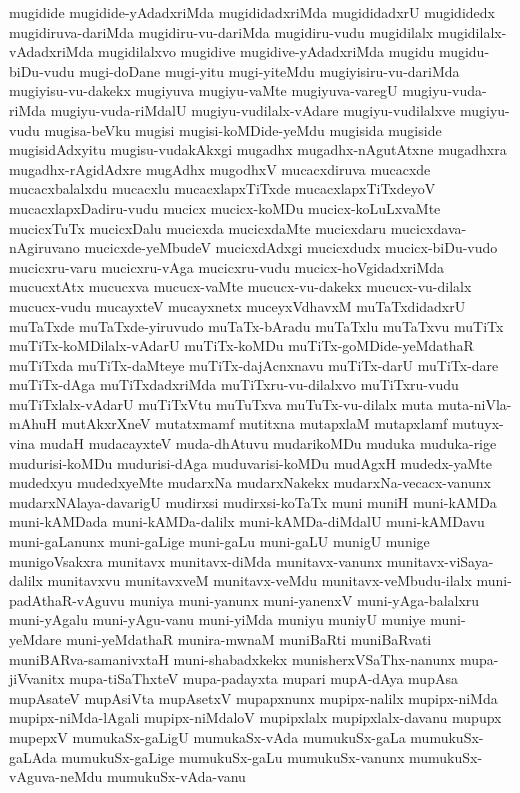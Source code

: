 {mugidide
mugidide-yAdadxriMda
mugididadxriMda
mugididadxrU
mugididedx
mugidiruva-dariMda
mugidiru-vu-dariMda
mugidiru-vudu
mugidilalx
mugidilalx-vAdadxriMda
mugidilalxvo
mugidive
mugidive-yAdadxriMda
mugidu
mugidu-biDu-vudu
mugi-doDane
mugi-yitu
mugi-yiteMdu
mugiyisiru-vu-dariMda
mugiyisu-vu-dakekx
mugiyuva
mugiyu-vaMte
mugiyuva-varegU
mugiyu-vuda-riMda
mugiyu-vuda-riMdalU
mugiyu-vudilalx-vAdare
mugiyu-vudilalxve
mugiyu-vudu
mugisa-beVku
mugisi
mugisi-koMDide-yeMdu
mugisida
mugiside
mugisidAdxyitu
mugisu-vudakAkxgi
mugadhx
mugadhx-nAgutAtxne
mugadhxra
mugadhx-rAgidAdxre
mugAdhx
mugodhxV
mucacxdiruva
mucacxde
mucacxbalalxdu
mucacxlu
mucacxlapxTiTxde
mucacxlapxTiTxdeyoV
mucacxlapxDadiru-vudu
mucicx
mucicx-koMDu
mucicx-koLuLxvaMte
mucicxTuTx
mucicxDalu
mucicxda
mucicxdaMte
mucicxdaru
mucicxdava-nAgiruvano
mucicxde-yeMbudeV
mucicxdAdxgi
mucicxdudx
mucicx-biDu-vudo
mucicxru-varu
mucicxru-vAga
mucicxru-vudu
mucicx-hoVgidadxriMda
mucucxtAtx
mucucxva
mucucx-vaMte
mucucx-vu-dakekx
mucucx-vu-dilalx
mucucx-vudu
mucayxteV
mucayxnetx
muceyxVdhavxM
muTaTxdidadxrU
muTaTxde
muTaTxde-yiruvudo
muTaTx-bAradu
muTaTxlu
muTaTxvu
muTiTx
muTiTx-koMDilalx-vAdarU
muTiTx-koMDu
muTiTx-goMDide-yeMdathaR
muTiTxda
muTiTx-daMteye
muTiTx-dajAcnxnavu
muTiTx-darU
muTiTx-dare
muTiTx-dAga
muTiTxdadxriMda
muTiTxru-vu-dilalxvo
muTiTxru-vudu
muTiTxlalx-vAdarU
muTiTxVtu
muTuTxva
muTuTx-vu-dilalx
muta
muta-niVla-mAhuH
mutAkxrXneV
mutatxmamf
mutitxna
mutapxlaM
mutapxlamf
mutuyx-vina
mudaH
mudacayxteV
muda-dhAtuvu
mudarikoMDu
muduka
muduka-rige
mudurisi-koMDu
mudurisi-dAga
muduvarisi-koMDu
mudAgxH
mudedx-yaMte
mudedxyu
mudedxyeMte
mudarxNa
mudarxNakekx
mudarxNa-vecacx-vanunx
mudarxNAlaya-davarigU
mudirxsi
mudirxsi-koTaTx
muni
muniH
muni-kAMDa
muni-kAMDada
muni-kAMDa-dalilx
muni-kAMDa-diMdalU
muni-kAMDavu
muni-gaLanunx
muni-gaLige
muni-gaLu
muni-gaLU
munigU
munige
munigoVsakxra
munitavx
munitavx-diMda
munitavx-vanunx
munitavx-viSaya-dalilx
munitavxvu
munitavxveM
munitavx-veMdu
munitavx-veMbudu-ilalx
muni-padAthaR-vAguvu
muniya
muni-yanunx
muni-yanenxV
muni-yAga-balalxru
muni-yAgalu
muni-yAgu-vanu
muni-yiMda
muniyu
muniyU
muniye
muni-yeMdare
muni-yeMdathaR
munira-mwnaM
muniBaRti
muniBaRvati
muniBARva-samanivxtaH
muni-shabadxkekx
munisherxVSaThx-nanunx
mupa-jiVvanitx
mupa-tiSaThxteV
mupa-padayxta
mupari
mupA-dAya
mupAsa
mupAsateV
mupAsiVta
mupAsetxV
mupapxnunx
mupipx-nalilx
mupipx-niMda
mupipx-niMda-lAgali
mupipx-niMdaloV
mupipxlalx
mupipxlalx-davanu
mupupx
mupepxV
mumukaSx-gaLigU
mumukaSx-vAda
mumukuSx-gaLa
mumukuSx-gaLAda
mumukuSx-gaLige
mumukuSx-gaLu
mumukuSx-vanunx
mumukuSx-vAguva-neMdu
mumukuSx-vAda-vanu
}
